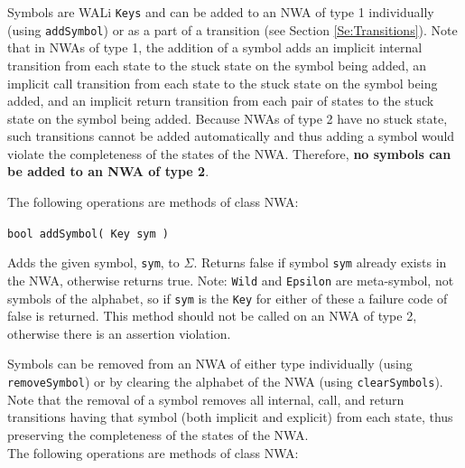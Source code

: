 \documentclass{llncs}
\begin{document}
Symbols are WALi \texttt{Keys} and can be added to an NWA of type 1
individually (using \texttt{addSymbol}) or as a part of a transition (see
Section \ref{Se:Transitions}).  Note that in NWAs of type 1, the addition of
a symbol adds an implicit internal transition from each state to the stuck
state on the symbol being added, an implicit call transition from each state
to the stuck state on the symbol being added, and an implicit return
transition from each pair of states to the stuck state on the symbol being
added.  Because NWAs of type 2 have no stuck state, such transitions cannot
be added automatically and thus adding a symbol would violate the
completeness of the states of the NWA.  Therefore, \textbf{no symbols can be
  added to an NWA of type 2}. \\

 \clearpage

\noindent The following operations are methods of class NWA:

\begin{description}

  \item\texttt{bool addSymbol( Key sym )} \nopagebreak

    Adds the given symbol, \texttt{sym}, to $\Sigma$.  Returns false if
    symbol \texttt{sym} already exists in the NWA, otherwise returns true.
    Note: \texttt{Wild} and \texttt{Epsilon} are meta-symbol, not symbols of
    the alphabet, so if \texttt{sym} is the \texttt{Key} for either of these
    a failure code of false is returned.  This method should not be called on
    an NWA of type 2, otherwise there is an assertion violation. \\

\end{description}

Symbols can be removed from an NWA of either type individually (using
\texttt{removeSymbol}) or by clearing the alphabet of the NWA (using
\texttt{clearSymbols}).  Note that the removal of a symbol removes all
internal, call, and return transitions having that symbol (both implicit and
explicit) from each state, thus preserving the completeness of the states of
the NWA. \\

\noindent The following operations are methods of class NWA:
\end{document}
